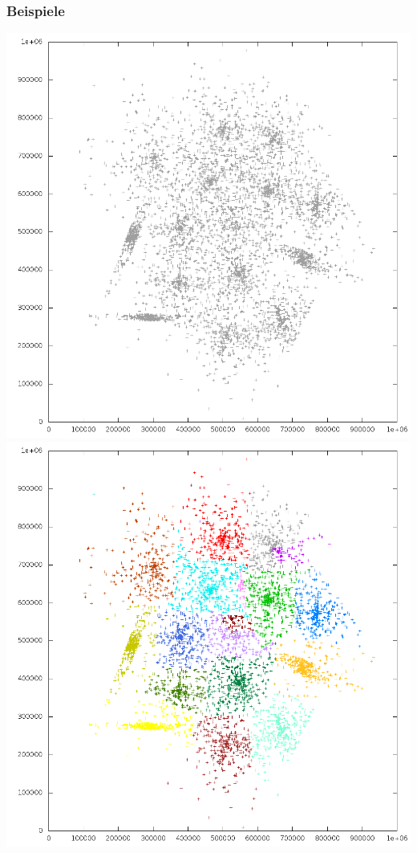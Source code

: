 \documentclass[10pt,utf8]{beamer}
\begin{document}
\begin{frame}
	\frametitle{Beispiele}
	\includegraphics[scale=0.22, keepaspectratio]{../output/pics/s4_black.png}
	\includegraphics[scale=0.22, keepaspectratio]{../output/pics/s4_colored.png}
\end{frame}
\end{document}
